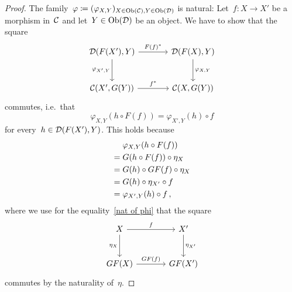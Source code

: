 \begin{proof}
  The family~$\varphi \coloneqq (\varphi_{X,Y})_{X \in \operatorname{Ob}(\mathcal{C}), Y \in \operatorname{Ob}(\mathcal{D})}$ is natural:
  Let~$f \colon X \to X'$ be a morphism in~$\mathcal{C}$ and let~$Y \in \operatorname{Ob}(\mathcal{D})$ be an object.
  We have to show that the square
  \[
    \begin{tikzcd}[sep = large]
        \Dcat(F(X'), Y)
        \arrow{r}[above]{F(f)^*}
        \arrow{d}[left]{\varphi_{X',Y}}
      & \Dcat(F(X), Y)
        \arrow{d}[right]{\varphi_{X,Y}}
      \\
        \Ccat(X', G(Y))
        \arrow{r}[above]{f^*}
      & \Ccat(X, G(Y))
    \end{tikzcd}
  \]
  commutes, i.e.\ that
  \[
      \varphi_{X,Y}(h \circ F(f))
    = \varphi_{X',Y}(h) \circ f
  \]
  for every~$h \in \mathcal{D}(F(X'), Y)$.
  This holds because
  \begin{align}
     {}&  \varphi_{X,Y}(h \circ F(f)) \notag  \\
    ={}&  G(h \circ F(f)) \circ \eta_X  \notag  \\
    ={}&  G(h) \circ GF(f) \circ \eta_X \notag  \\
    ={}&  G(h) \circ \eta_{X'} \circ f  \label{nat of phi}  \\
    ={}&  \varphi_{X',Y}(h) \circ f \notag  \,,
  \end{align}
  where we use for the equality~\eqref{nat of phi} that the square
  \[
    \begin{tikzcd}[sep = large]
        X
        \arrow{r}[above]{f}
        \arrow{d}[left]{\eta_X}
      & X'
        \arrow{d}[right]{\eta_{X'}}
      \\
        GF(X)
        \arrow{r}[above]{GF(f)}
      & GF(X')
    \end{tikzcd}
  \]
  commutes by the naturality of~$\eta$.
  

\end{proof}
